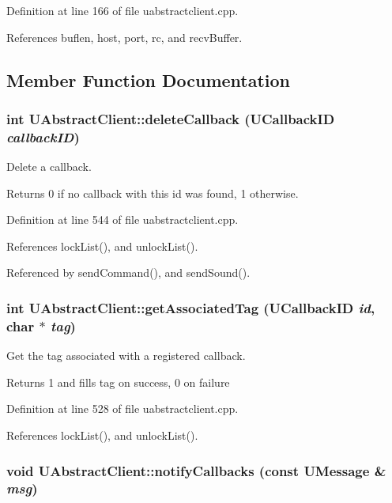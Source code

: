 Definition at line 166 of file uabstractclient.cpp.

References buflen, host, port, rc, and recv\-Buffer.

\subsection{Member Function Documentation}
\subsubsection{\setlength{\rightskip}{0pt plus 5cm}int UAbstract\-Client::delete\-Callback (UCallback\-ID {\em callback\-ID})}\label{classUAbstractClient_a28}


Delete a callback. 

Returns 0 if no callback with this id was found, 1 otherwise. 

Definition at line 544 of file uabstractclient.cpp.

References lock\-List(), and unlock\-List().

Referenced by send\-Command(), and send\-Sound().
\subsubsection{\setlength{\rightskip}{0pt plus 5cm}int UAbstract\-Client::get\-Associated\-Tag (UCallback\-ID {\em id}, char $\ast$ {\em tag})}\label{classUAbstractClient_a27}


Get the tag associated with a registered callback. 

Returns 1 and fills tag on success, 0 on failure 

Definition at line 528 of file uabstractclient.cpp.

References lock\-List(), and unlock\-List().
\subsubsection{\setlength{\rightskip}{0pt plus 5cm}void UAbstract\-Client::notify\-Callbacks (const {\bf UMessage} \& {\em msg})}\label{classUAbstractClient_a30}


